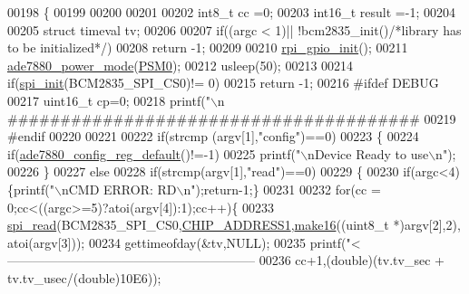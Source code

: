 \begin{DoxyCode}
00198                                          \{
00199     
00200      
00201      
00202     int8\_t cc =0;
00203     int16\_t result =-1;
00204     
00205     \textcolor{keyword}{struct }timeval tv;
00206 
00207      \textcolor{keywordflow}{if}((argc < 1)|| !bcm2835\_init()\textcolor{comment}{/*library has to be initialized*/})   
00208            \textcolor{keywordflow}{return} -1;    
00209      
00210     \hyperlink{a00004_ga156b48448f55534a2f9c805a1f760efa}{rpi\_gpio\_init}();
00211     \hyperlink{a00004_gae9a5abd4e5054e7ea3f149b1764f2cd0}{ade7880\_power\_mode}(\hyperlink{a00036_ad03c0079a6239f78368cb14cc4578101}{PSM0});
00212     usleep(50);
00213     
00214     \textcolor{keywordflow}{if}(\hyperlink{a00004_ga96ddfd5c89b80852982ba50dd18256f6}{spi\_init}(BCM2835\_SPI\_CS0)!= 0)
00215     \textcolor{keywordflow}{return} -1;
00216 \textcolor{preprocessor}{        #ifdef DEBUG }
00217 \textcolor{preprocessor}{}        uint16\_t cp=0;
00218         printf(\textcolor{stringliteral}{"\(\backslash\)n
      #######################################%
00219 \textcolor{preprocessor}{        #endif}
00220 \textcolor{preprocessor}{}     
00221     
00222      \textcolor{keywordflow}{if}(strcmp (argv[1],\textcolor{stringliteral}{"config"})==0)
00223      \{
00224         \textcolor{keywordflow}{if}(\hyperlink{a00004_ga7782772c18e6ea515dcd28dcaedd0f06}{ade7880\_config\_reg\_default}()!=-1)
00225               printf(\textcolor{stringliteral}{"\(\backslash\)nDevice Ready to use\(\backslash\)n"});
00226      \} 
00227      \textcolor{keywordflow}{else} 
00228      \textcolor{keywordflow}{if}(strcmp(argv[1],\textcolor{stringliteral}{"read"})==0)   
00229      \{
00230         \textcolor{keywordflow}{if}(argc<4)\{printf(\textcolor{stringliteral}{"\(\backslash\)nCMD ERROR: RD\(\backslash\)n"});\textcolor{keywordflow}{return}-1;\}
00231           
00232         \textcolor{keywordflow}{for}(cc = 0;cc<((argc>=5)?atoi(argv[4]):1);cc++)\{
00233          \hyperlink{a00006_ga7ad9f65ee46aca507374096506a0b1c4}{spi\_read}(BCM2835\_SPI\_CS0,\hyperlink{a00036_a94de2b046db6e10257ef4481c0a15eaa}{CHIP\_ADDRESS1},\hyperlink{a00008_ga1e74920f34a07a82cca58eab71ed12b3}{make16}((uint8\_t *)argv[2],2),
      atoi(argv[3]));
00234          gettimeofday(&tv,NULL);
00235          printf(\textcolor{stringliteral}{"<----------------------------------------------------------- %
00236          cc+1,(\textcolor{keywordtype}{double})(tv.tv\_sec + tv.tv\_usec/(\textcolor{keywordtype}{double})10E6));
}}
\end{DoxyCode}

